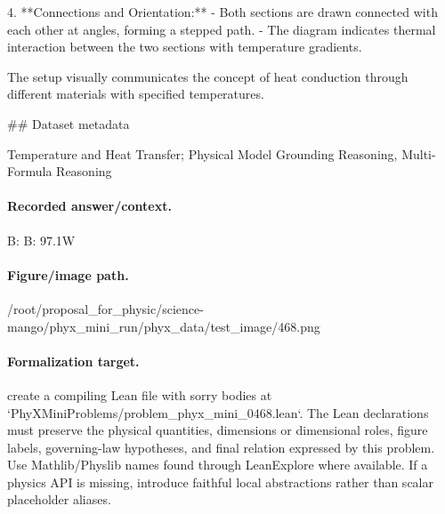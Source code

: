 4. **Connections and Orientation:**
   - Both sections are drawn connected with each other at angles, forming a stepped path.
   - The diagram indicates thermal interaction between the two sections with temperature gradients.

The setup visually communicates the concept of heat conduction through different materials with specified temperatures.

\#\# Dataset metadata

Temperature and Heat Transfer; Physical Model Grounding Reasoning, Multi-Formula Reasoning

\paragraph{Recorded answer/context.}
B: B: 97.1W

\paragraph{Figure/image path.}
/root/proposal\_for\_physic/science-mango/phyx\_mini\_run/phyx\_data/test\_image/468.png

\paragraph{Formalization target.}
create a compiling Lean file with sorry bodies at `PhyXMiniProblems/problem\_phyx\_mini\_0468.lean`. The Lean declarations must preserve the physical quantities, dimensions or dimensional roles, figure labels, governing-law hypotheses, and final relation expressed by this problem.
Use Mathlib/Physlib names found through LeanExplore where available. If a physics API is missing, introduce faithful local abstractions rather than scalar placeholder aliases.

